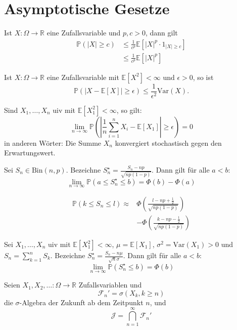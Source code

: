 \documentclass[prb,12pt, twocolumn]{revtex4-2}
\theoremstyle{definition}
\theoremstyle{definition}
\theoremstyle{definition}
\newcommand{\R}{\mathbb{R}}
\begin{document}
\section{Asymptotische Gesetze}
\begin{Note}
	Ist $X:\Omega\to \R$ eine Zufallsvariable und $p,c>0$, dann gilt
	\begin{align*}
		\mathbb{P}(|X|\ge c) &\le \frac{1}{c^p}\mathbb{E}[|X|^p \cdot 1_{|X|\ge c}]\\
				     &\le \frac{1}{c^p}\mathbb{E}[|X|^p]
	\end{align*}
\end{Note}
\begin{Note}
	Ist $X:\Omega\to \R$ eine Zufallsvariable mit $\mathbb{E}[X^2]<\infty$ und $\epsilon>0$, so ist
	\[
		\mathbb{P}(|X- \mathbb{E}[X]|\ge \epsilon) \le \frac{1}{\epsilon^2}\text{Var}(X)
	.\] 
\end{Note}
\begin{Note}
	Sind $X_1, \dots, X_n$ uiv mit $\mathbb{E}[X_1^2]<\infty$, so gilt:
	\[\lim_{n\to\infty}\mathbb{P}\left(\left|\frac 1n \sum_{i=1}^n X_i - \mathbb{E}[X_1]\right|\ge \epsilon \right)=0\]
	in anderen Wörter: Die Summe $X_n$ konvergiert stochastisch gegen den Erwartungswert.
\end{Note}
\begin{Note}
	Sei $S_n\in \text{Bin}(n, p)$. Bezeichne $S_n^\star=\frac{S_n - np}{\sqrt{np(1-p)}}$. Dann gilt f\"{u}r alle $a<b$:
	\[\lim_{n\to\infty} \mathbb{P}(a\le S_n^\star \le b)=\Phi(b) - \Phi(a)\]
\end{Note}
\begin{Note}[Stetigkeitskorrektur]
	\begin{align*}
	\mathbb{P}(k\le S_n \le l)\approx& \Phi\left(\frac{l - np + \frac 12}{\sqrt{np(1-p)}}\right)\\
	&-\Phi\left(\frac{k - np - \frac 12}{\sqrt{np(1-p)}}\right)
\end{align*}
\end{Note}
\begin{Note}
		Sei $X_1, \dots, X_n$ uiv mit $\mathbb{E}[X_1^2]<\infty$, $\mu=\mathbb{E}[X_1]$, $\sigma^2 = \text{Var}(X_1)>0$ und $S_n = \sum_{k=1}^n S_k$. Bezeichne $S_n^\star=\frac{S_n - n\mu}{\sqrt{n}\sigma}$. Dann gilt f\"{u}r alle $a<b$:
		\[\lim_{n\to\infty} \mathbb{P}(S_n^\star \le b)=\Phi(b)\]
\end{Note}
\begin{Note}
	Seien $X_1, X_2,\dots:\Omega\to \R$ Zufallsvariablen und
	\[\mathcal{F}_n' = \sigma(X_k, k\ge n)\]
	die $\sigma$-Algebra der Zukunft ab dem Zeitpunkt $n$, und
	\[\mathcal{J} = \bigcap_{n=1}^\infty \mathcal{F}_n'\]
\end{Note}
\end{document}
